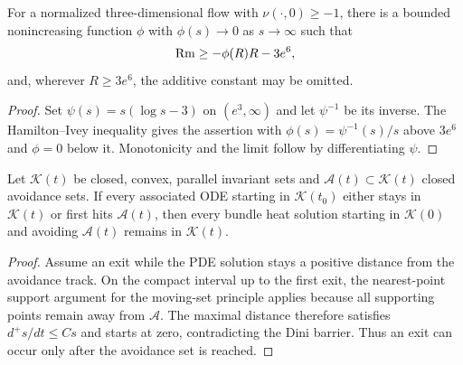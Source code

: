 \begin{corollary}
\label{cor:chow-ii-almost-nonnegative-curvature}


For a normalized three-dimensional flow with $\nu(\cdot,0)\ge-1$, there is a
bounded nonincreasing function $\phi$ with $\phi(s)\to0$ as $s\to\infty$ such
that
\[
\operatorname{Rm}\ge-\phi(R)R-3e^6,
\]
and, wherever $R\ge3e^6$, the additive constant may be omitted.
\end{corollary}
\begin{proof}
\sketch
Set $\psi(s)=s(\log s-3)$ on $(e^3,\infty)$ and let $\psi^{-1}$ be its
inverse.  The Hamilton--Ivey inequality gives the assertion with
$\phi(s)=\psi^{-1}(s)/s$ above $3e^6$ and $\phi=0$ below it.  Monotonicity and
the limit follow by differentiating $\psi$.
\end{proof}

\begin{theorem}
\label{thm:chow-ii-system-avoidance-wmp}


Let $\mathcal K(t)$ be closed, convex, parallel invariant sets and
$\mathcal A(t)\subset\mathcal K(t)$ closed avoidance sets.  If every associated
ODE starting in $\mathcal K(t_0)$ either stays in $\mathcal K(t)$ or first hits
$\mathcal A(t)$, then every bundle heat solution starting in $\mathcal K(0)$
and avoiding $\mathcal A(t)$ remains in $\mathcal K(t)$.
\end{theorem}
\begin{proof}
\sketch
{}
Assume an exit while the PDE solution stays a positive distance from the
avoidance track.  On the compact interval up to the first exit, the nearest-point
support argument for the moving-set principle applies because all supporting
points remain away from $\mathcal A$.  The maximal distance therefore satisfies
$d^+s/dt\le Cs$ and starts at zero, contradicting the Dini barrier.  Thus an
exit can occur only after the avoidance set is reached.
\end{proof}

